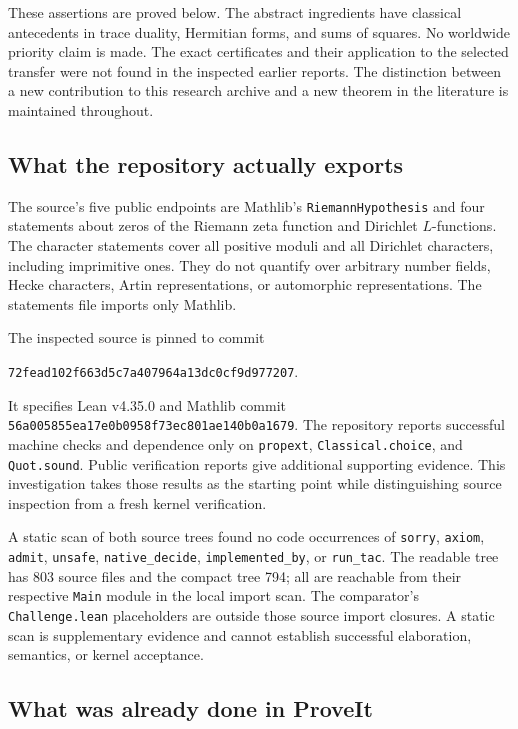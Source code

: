 These assertions are proved below. The abstract ingredients have classical antecedents in trace duality, Hermitian forms, and sums of squares. No worldwide priority claim is made. The exact certificates and their application to the selected transfer were not found in the inspected earlier reports. The distinction between a new contribution to this research archive and a new theorem in the literature is maintained throughout.\cite{Milne,BCIL,priorSynthesis}

\subsection{What the repository actually exports}

The source's five public endpoints are Mathlib's \texttt{RiemannHypothesis} and four statements about zeros of the Riemann zeta function and Dirichlet $L$-functions. The character statements cover all positive moduli and all Dirichlet characters, including imprimitive ones. They do not quantify over arbitrary number fields, Hecke characters, Artin representations, or automorphic representations. The statements file imports only Mathlib.\cite{source}

The inspected source is pinned to commit
\begin{center}\texttt{72fead102f663d5c7a407964a13dc0cf9d977207}.\end{center}
It specifies Lean v4.35.0 and Mathlib commit
\texttt{56a005855ea17e0b0958f73ec801ae140b0a1679}.
The repository reports successful machine checks and dependence only on
\texttt{propext}, \texttt{Classical.choice}, and \texttt{Quot.sound}.
Public verification reports give additional supporting evidence. This investigation takes those results as the starting point while distinguishing source inspection from a fresh kernel verification.\cite{source,Sutherland,Sonoda}

A static scan of both source trees found no code occurrences of \texttt{sorry}, \texttt{axiom}, \texttt{admit}, \texttt{unsafe}, \texttt{native\_decide}, \texttt{implemented\_by}, or \texttt{run\_tac}. The readable tree has 803 source files and the compact tree 794; all are reachable from their respective \texttt{Main} module in the local import scan. The comparator's \texttt{Challenge.lean} placeholders are outside those source import closures. A static scan is supplementary evidence and cannot establish successful elaboration, semantics, or kernel acceptance.

\subsection{What was already done in ProveIt}

